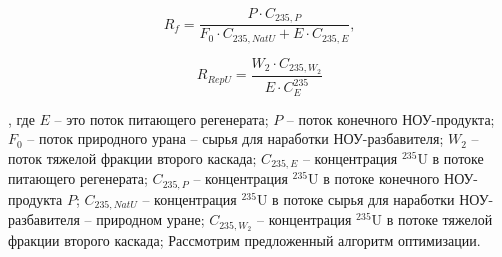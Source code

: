 \begin{equation} \label{Rec2} 
    R_f = \frac{P \cdot C_{235,P}}{F_0 \cdot C_{235,NatU} + E \cdot C_{235,E}}, 
\end{equation} 

\begin{equation} \label{RecR2} 
    R_{RepU} = \frac{W_2\cdot C_{235,W_2}}{E \cdot C_{E}^{235}}        
\end{equation} 

, где $E$ -- это поток питающего регенерата; $P$ -- поток конечного НОУ-продукта; $F_0$ -- поток природного урана -- сырья для наработки НОУ-разбавителя; $W_2$ -- поток тяжелой фракции второго каскада;
$C_{235,E}$ -- концентрация $^{235}$U в потоке питающего регенерата; $C_{235,P}$ -- концентрация $^{235}$U в потоке конечного НОУ-продукта $P$; $C_{235,NatU}$ -- концентрация $^{235}$U в потоке сырья для наработки НОУ-разбавителя -- природном уране; $C_{235,W_2}$ -- концентрация $^{235}$U в потоке тяжелой фракции второго каскада;
Рассмотрим предложенный алгоритм оптимизации.

